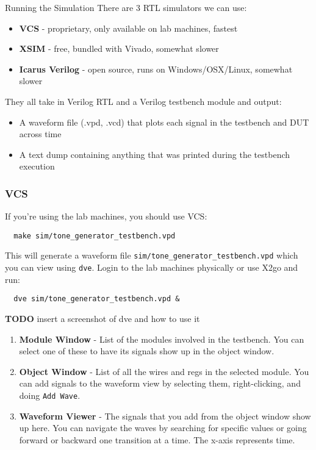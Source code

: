 \documentclass[11pt]{article}
\makeatletter
\renewcommand{\subsection}
{\@startsection {subsection}{1}{0pt}
 {-1ex}
 {0.5ex}
 {\bfseries\normalsize}}
\makeatother
\begin{document}
\subsection{Running the Simulation}
There are 3 RTL simulators we can use:
\begin{itemize}
  \item \textbf{VCS} - proprietary, only available on lab machines, fastest
  \item \textbf{XSIM} - free, bundled with Vivado, somewhat slower
  \item \textbf{Icarus Verilog} - open source, runs on Windows/OSX/Linux, somewhat slower
\end{itemize}
They all take in Verilog RTL and a Verilog testbench module and output:
\begin{itemize}
  \item A waveform file (.vpd, .vcd) that plots each signal in the testbench and DUT across time
  \item A text dump containing anything that was printed during the testbench execution
\end{itemize}

\subsubsection{VCS}
If you're using the lab machines, you should use VCS:
\begin{verbatim}
  make sim/tone_generator_testbench.vpd
\end{verbatim}
This will generate a waveform file \verb|sim/tone_generator_testbench.vpd| which you can view using \verb|dve|.
Login to the lab machines physically or use X2go and run:
\begin{verbatim}
  dve sim/tone_generator_testbench.vpd &
\end{verbatim}

\textbf{TODO} insert a screenshot of dve and how to use it
\begin{enumerate}
  \item \textbf{Module Window} - List of the modules involved in the testbench. You can select one of these to have its signals show up in the object window.
  \item \textbf{Object Window} - List of all the wires and regs in the selected module. You can add signals to the waveform view by selecting them, right-clicking, and doing \verb|Add Wave|.
  \item \textbf{Waveform Viewer} - The signals that you add from the object window show up here. You can navigate the waves by searching for specific values or going forward or backward one transition at a time. The x-axis represents time.
\end{enumerate}
\end{document}
